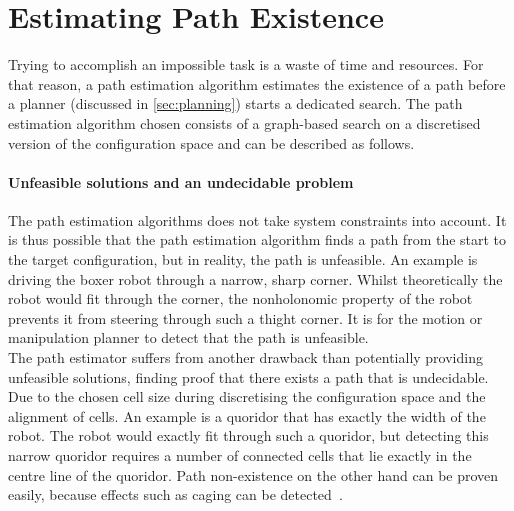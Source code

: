 \section{Estimating Path Existence}%
\label{sec:estimating_path_existence}
Trying to accomplish an impossible task is a waste of time and resources. For that reason, a path estimation algorithm estimates the existence of a path before a planner (discussed in \cref{sec:planning}) starts a dedicated search. The path estimation algorithm chosen consists of a graph-based search on a discretised version of the configuration space and can be described as follows.\bs

\bs


\paragraph{Unfeasible solutions and an undecidable problem}
The path estimation algorithms does not take system constraints into account. It is thus possible that the path estimation algorithm finds a path from the start to the target configuration, but in reality, the path is unfeasible. An example is driving the boxer robot through a narrow, sharp corner. Whilst theoretically the robot would fit through the corner, the nonholonomic property of the robot prevents it from steering through such a thight corner. It is for the motion or manipulation planner to detect that the path is unfeasible.\\The path estimator suffers from another drawback than potentially providing unfeasible solutions, finding proof that there exists a path that is undecidable. Due to the chosen cell size during discretising the configuration space and the alignment of cells. An example is a quoridor that has exactly the width of the robot. The robot would exactly fit through such a quoridor, but detecting this narrow quoridor requires a number of connected cells that lie exactly in the centre line of the quoridor. Path non-existence on the other hand can be proven easily, because effects such as caging can be detected~\cite{chen_fast_2018}.\bs


